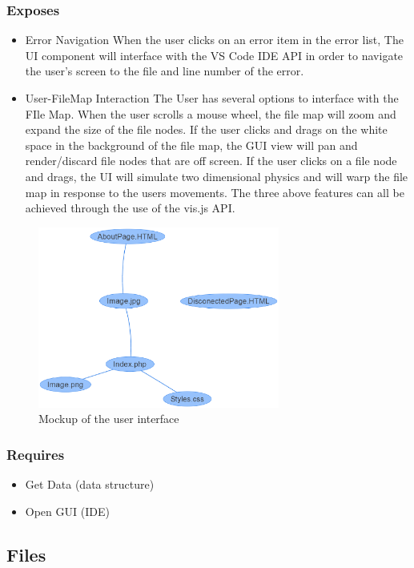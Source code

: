 \documentclass[letterpaper,10pt,titlepage,draftclsnofoot,onecolumn,onesided] {IEEEtran}
\begin{document}
\begin{itemize}
		\subsubsection{Exposes}
		\begin{itemize}
			\item Error Navigation 
			When the user clicks on an error item in the error list, The UI component will interface with the VS Code IDE API in order to navigate the user's screen to the file and line number of the error.
			\item User-FileMap Interaction
			The User has several options to interface with the FIle Map. 
			When the user scrolls a mouse wheel, the file map will zoom and expand the size of the file nodes.
			If the user clicks and drags on the white space in the background of the file map, the GUI view will pan and render/discard file nodes that are off screen.
			If the user clicks on a file node and drags, the UI will simulate two dimensional physics and will warp the file map in response to the users movements.
			The three above features can all be achieved through the use of the vis.js API.
		\end{itemize}
		\begin{figure}
                 \includegraphics[width=300px]{UIMockupEPS.eps}
                 \caption{Mockup of the user interface}
                 \end{figure}
		\subsubsection{Requires}
		\begin{itemize}
			\item Get Data (data structure)
			\item Open GUI (IDE)
		\end{itemize}
		
	\subsection{Files}

\end{itemize}
\end{document}
